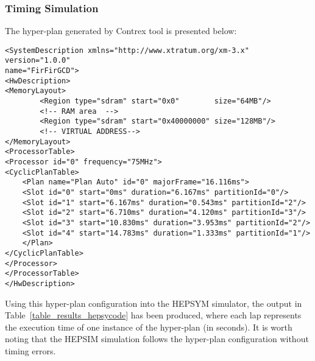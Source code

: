 \subsubsection{Timing Simulation}
%
The hyper-plan generated by Contrex tool is presented below:
%
\scriptsize
\lstset{language=XML}
\begin{lstlisting}
<SystemDescription xmlns="http://www.xtratum.org/xm-3.x" version="1.0.0" 
name="FirFirGCD">
<HwDescription>
<MemoryLayout>
        <Region type="sdram" start="0x0"        size="64MB"/>  
        <!-- RAM area  -->
        <Region type="sdram" start="0x40000000" size="128MB"/>  
        <!-- VIRTUAL ADDRESS-->
</MemoryLayout>
<ProcessorTable>
<Processor id="0" frequency="75MHz">
<CyclicPlanTable>
    <Plan name="Plan Auto" id="0" majorFrame="16.116ms">
    <Slot id="0" start="0ms" duration="6.167ms" partitionId="0"/>
    <Slot id="1" start="6.167ms" duration="0.543ms" partitionId="2"/>
    <Slot id="2" start="6.710ms" duration="4.120ms" partitionId="3"/>
    <Slot id="3" start="10.830ms" duration="3.953ms" partitionId="2"/>
    <Slot id="4" start="14.783ms" duration="1.333ms" partitionId="1"/>
    </Plan>
</CyclicPlanTable>
</Processor>
</ProcessorTable>
</HwDescription>
\end{lstlisting}
\normalsize
%
Using this hyper-plan configuration into the HEPSYM simulator, the output in Table~\ref{table_results_hepsycode} has been produced, where each lap represents the execution time of one instance of the hyper-plan (in seconds). It is worth noting that the HEPSIM simulation follows the hyper-plan configuration without timing errors.
%
